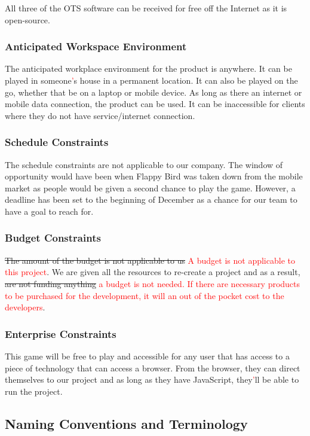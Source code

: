\documentclass[11pt, oneside]{article}   	%
\begin{document}
All three of the OTS software can be received for free off the Internet as it is open-source.


\subsubsection{Anticipated Workspace Environment}
The anticipated workplace environment for the product is anywhere. It can be played in someone\textcolor{red}{'}s house in a permanent location. It can also be played on the go, whether that be on a laptop or mobile device. As long as there an internet or mobile data connection, the product can be used. It can be inaccessible for clients where they do not have service/internet connection.


\subsubsection{Schedule Constraints}
The schedule constraints are not applicable to our company.  The window of opportunity would have been when Flappy Bird was taken down from the mobile market as people would be given a second chance to play the game. However, a deadline has been set to the beginning of December as a chance for our team to have a goal to reach for.


\subsubsection{Budget Constraints}
\sout{The amount of the budget is not applicable to us} \textcolor{red}{A budget is not applicable to this project}. We are given all the resources to re-create a project and as a result, \sout{are not funding anything} \textcolor{red}{a budget is not needed. If there are necessary products to be purchased for the development, it will an out of the pocket cost to the developers}.


\subsubsection{Enterprise Constraints}
This game will be free to play and accessible for any user that has access to a piece of technology that can access a browser. From the browser, they can direct themselves to our project and as long as they have JavaScript, they\textcolor{red}{'}ll be able to run the project.


\subsection{Naming Conventions and Terminology}
\end{document}
